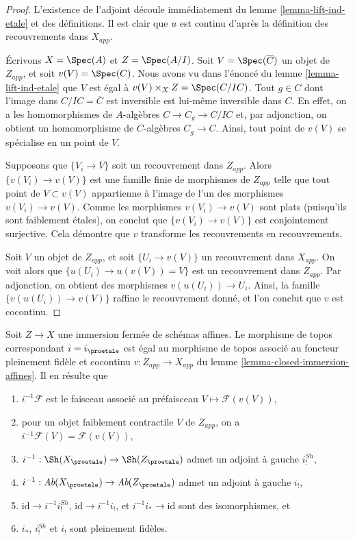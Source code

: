 \begin{proof}
L'existence de l'adjoint découle immédiatement du
lemme \ref{lemma-lift-ind-etale} et des définitions.
Il est clair que $u$ est continu d'après la définition des
recouvrements dans $X_{app}$.

\medskip\noindent
Écrivons $X = \Spec(A)$ et $Z = \Spec(A/I)$. Soit $V = \Spec(\overline{C})$
un objet de $Z_{app}$, et soit $v(V) = \Spec(C)$.
Nous avons vu dans l'énoncé du lemme \ref{lemma-lift-ind-etale}
que $V$ est égal à $v(V) \times_X Z = \Spec(C/IC)$.
Tout $g \in C$ dont l'image dans
$C/IC = \overline{C}$ est inversible est lui-même inversible dans $C$. En effet, on a les
homomorphismes de $A$-algèbres $C \to C_g \to C/IC$ et, par adjonction,
on obtient un homomorphisme de $C$-algèbres $C_g \to C$.
Ainsi, tout point de $v(V)$ se spécialise en un point de $V$.

\medskip\noindent
Supposons que $\{V_i \to V\}$ soit un recouvrement dans $Z_{app}$.
Alors $\{v(V_i) \to v(V)\}$ est une famille finie de morphismes de
$Z_{app}$ telle que tout point de $V \subset v(V)$ appartienne
à l'image de l'un des morphismes $v(V_i) \to v(V)$. Comme les
morphismes $v(V_i) \to v(V)$ sont plats (puisqu'ils sont faiblement \'etales),
on conclut que $\{v(V_i) \to v(V)\}$ est conjointement surjective.
Cela démontre que $v$ transforme les recouvrements en recouvrements.

\medskip\noindent
Soit $V$ un objet de $Z_{app}$, et soit $\{U_i \to v(V)\}$
un recouvrement dans $X_{app}$. On voit alors que
$\{u(U_i) \to u(v(V)) = V\}$ est un recouvrement dans $Z_{app}$.
Par adjonction, on obtient des morphismes $v(u(U_i)) \to U_i$.
Ainsi, la famille $\{v(u(U_i)) \to v(V)\}$ raffine le
recouvrement donné, et l'on conclut que $v$ est cocontinu.
\end{proof}

\begin{lemma}
\label{lemma-closed-immersion-affines-apply}
Soit $Z \to X$ une immersion fermée de schémas affines.
Le morphisme de topos correspondant $i = i_\proetale$
est égal au morphisme de topos
associé au foncteur pleinement fidèle et cocontinu
$v : Z_{app} \to X_{app}$ du lemme \ref{lemma-closed-immersion-affines}.
Il en résulte que
\begin{enumerate}
\item $i^{-1}\mathcal{F}$ est le faisceau associé au préfaisceau
$V \mapsto \mathcal{F}(v(V))$,
\item pour un objet faiblement contractile $V$ de $Z_{app}$, on a
$i^{-1}\mathcal{F}(V) = \mathcal{F}(v(V))$,
\item $i^{-1} : \Sh(X_\proetale) \to \Sh(Z_\proetale)$
admet un adjoint à gauche $i^{Sh}_!$,
\item $i^{-1} : \textit{Ab}(X_\proetale) \to \textit{Ab}(Z_\proetale)$
admet un adjoint à gauche $i_!$,
\item $\text{id} \to i^{-1}i^{Sh}_!$, $\text{id} \to i^{-1}i_!$, et
$i^{-1}i_* \to \text{id}$ sont des isomorphismes, et
\item $i_*$, $i^{Sh}_!$ et $i_!$ sont pleinement fidèles.
\end{enumerate}
\end{lemma}

